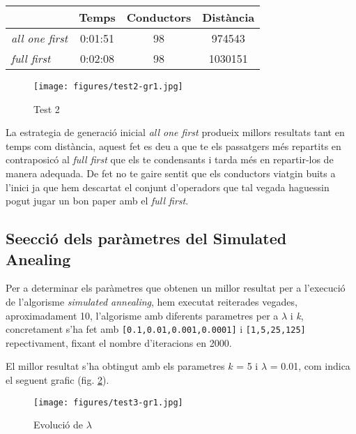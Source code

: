 \begin{center}
\begin{tabular}{l|ccc}
         & Temps & Conductors & Distància\\
\hline
\emph{all one first} & 0:01:51 & 98 & 974543  \\
\emph{full first} & 0:02:08 & 98 & 1030151 
\end{tabular}
\end{center}

\begin{figure}[H]
\begin{center}
 \texttt{[image: figures/test2-gr1.jpg]}
 \label{test3-gr2}
\caption{Test 2}
\end{center}
\end{figure}
                                                                                                                                                                                  
La estrategia de generació inicial \emph{all one first} produeix millors resultats tant en temps com distància,
aquest fet es deu a que te els passatgers més repartits en contraposicó al \emph{full first} que els te
condensants i tarda més en repartir-los de manera adequada. De fet no te gaire sentit que els conductors
viatgin buits a l'inici ja que hem descartat el conjunt d'operadors que tal vegada haguessin pogut
jugar un bon paper amb el \emph{full first}.

\subsection{Se\lgem ecció dels paràmetres del Simulated Anealing}
Per a determinar els paràmetres que obtenen un millor resultat per a l'execució de l'algorisme \emph{simulated annealing},
hem executat reiterades vegades, aproximadament 10, l'algorisme amb diferents parametres per a $\lambda$ i \emph{k}, concretament s'ha fet amb
\texttt{[0.1,0.01,0.001,0.0001]} i \texttt{[1,5,25,125]} repectivament, fixant el nombre d'iteracions en 2000.

El millor resultat s'ha obtingut amb els parametres $k$ = 5 i $\lambda$ = 0.01, com indica el seguent grafic (fig. \ref{test3-gr1}).

\begin{figure}[H]
\begin{center} 
 \texttt{[image: figures/test3-gr1.jpg]}
\label{test3-gr1}
\caption{Evolució de $\lambda$}
\end{center}
\end{figure}

